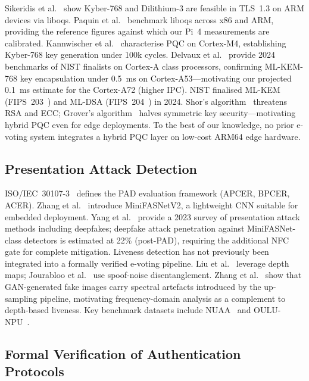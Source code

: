 \documentclass[pdflatex,sn-vancouver-num]{sn-jnl}%
\theoremstyle{thmstyleone}%
\theoremstyle{thmstyletwo}%
\theoremstyle{thmstylethree}%
\begin{document}
Sikeridis et al.~\cite{sikeridis2020pqc} show Kyber-768 and Dilithium-3 are
feasible in TLS~1.3 on ARM devices via liboqs. Paquin et
al.~\cite{paquin2020oqs} benchmark liboqs across x86 and ARM, providing the
reference figures against which our Pi~4 measurements are calibrated.
Kannwischer et al.~\cite{kannwischer2019pqm4} characterise PQC on Cortex-M4,
establishing Kyber-768 key generation under 100k cycles. Delvaux et
al.~\cite{delvaux2024pqc_iot} provide 2024 benchmarks of NIST finalists on
Cortex-A class processors, confirming ML-KEM-768 key encapsulation under
0.5~ms on Cortex-A53---motivating our projected 0.1~ms estimate for the
Cortex-A72 (higher IPC). NIST finalised ML-KEM (FIPS~203~\cite{nist_fips203})
and ML-DSA (FIPS~204~\cite{nist_fips204}) in 2024.
Shor's algorithm~\cite{shor1994algorithms} threatens RSA and ECC; Grover's
algorithm~\cite{grover1996fast} halves symmetric key security---motivating
hybrid PQC even for edge deployments. To the best of our knowledge, no prior
e-voting system integrates a hybrid PQC layer on low-cost ARM64 edge hardware.

\subsection{Presentation Attack Detection}

ISO/IEC~30107-3~\cite{iso30107} defines the PAD evaluation framework (APCER,
BPCER, ACER). Zhang et al.~\cite{zhang2020minifasnet} introduce MiniFASNetV2,
a lightweight CNN suitable for embedded deployment. Yang et
al.~\cite{yang2023pad_survey} provide a 2023 survey of presentation attack
methods including deepfakes; deepfake attack penetration against
MiniFASNet-class detectors is estimated at 22\% (post-PAD), requiring the
additional NFC gate for complete mitigation. Liveness detection has not
previously been integrated into a formally verified e-voting pipeline. Liu et
al.~\cite{liu2018learning} leverage depth maps; Jourabloo et
al.~\cite{jourabloo2018desp} use spoof-noise disentanglement. Zhang et
al.~\cite{zhang2019autoGAN} show that GAN-generated fake images carry spectral
artefacts introduced by the up-sampling pipeline, motivating frequency-domain
analysis as a complement to depth-based liveness. Key benchmark datasets
include NUAA~\cite{tan2010nuaa} and OULU-NPU~\cite{boulkenafet2017oulu}.

\subsection{Formal Verification of Authentication Protocols}
\end{document}
